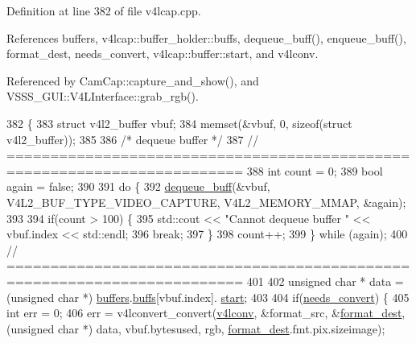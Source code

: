 Definition at line 382 of file v4lcap.\+cpp.



References buffers, v4lcap\+::buffer\+\_\+holder\+::buffs, dequeue\+\_\+buff(), enqueue\+\_\+buff(), format\+\_\+dest, needs\+\_\+convert, v4lcap\+::buffer\+::start, and v4lconv.



Referenced by Cam\+Cap\+::capture\+\_\+and\+\_\+show(), and V\+S\+S\+S\+\_\+\+G\+U\+I\+::\+V4\+L\+Interface\+::grab\+\_\+rgb().


\begin{DoxyCode}
382                                            \{
383     \textcolor{keyword}{struct }v4l2\_buffer vbuf;
384     memset(&vbuf, 0, \textcolor{keyword}{sizeof}(\textcolor{keyword}{struct} v4l2\_buffer));
385 
386     \textcolor{comment}{/* dequeue buffer */}
387     \textcolor{comment}{// =========================================================================}
388     \textcolor{keywordtype}{int} count = 0;
389     \textcolor{keywordtype}{bool} again = \textcolor{keyword}{false};
390 
391     \textcolor{keywordflow}{do} \{
392         \hyperlink{classv4lcap_a73678c131c1ac6c555be3ea125be08da}{dequeue\_buff}(&vbuf, V4L2\_BUF\_TYPE\_VIDEO\_CAPTURE, V4L2\_MEMORY\_MMAP, &again);
393 
394         \textcolor{keywordflow}{if}(count > 100) \{
395             std::cout << \textcolor{stringliteral}{"Cannot dequeue buffer "} << vbuf.index << std::endl;
396             \textcolor{keywordflow}{break};
397         \}
398         count++;
399     \} \textcolor{keywordflow}{while} (again);
400     \textcolor{comment}{// =========================================================================}
401 
402     \textcolor{keywordtype}{unsigned} \textcolor{keywordtype}{char} * data = (\textcolor{keywordtype}{unsigned} \textcolor{keywordtype}{char} *) \hyperlink{classv4lcap_a046084072d2279bb204ed93cd2692700}{buffers}.\hyperlink{structv4lcap_1_1buffer__holder_afa53426fad11e19f7d615f564c979495}{buffs}[vbuf.index].
      \hyperlink{structv4lcap_1_1buffer_ae4fca9eb7724f4a93ee14537fb34597e}{start};
403 
404     \textcolor{keywordflow}{if}(\hyperlink{classv4lcap_acd02d2da6ff03a44a2e155af449144e4}{needs\_convert}) \{
405         \textcolor{keywordtype}{int} err = 0;
406         err = v4lconvert\_convert(\hyperlink{classv4lcap_a5e57bbf84383d7b42d0cc9d1e7e03abb}{v4lconv}, &format\_src, &\hyperlink{classv4lcap_a51d51cae7bdc2fe6aa5bec4ddbeb6c31}{format\_dest}, (\textcolor{keywordtype}{unsigned} \textcolor{keywordtype}{char} *) 
      data, vbuf.bytesused, rgb, \hyperlink{classv4lcap_a51d51cae7bdc2fe6aa5bec4ddbeb6c31}{format\_dest}.fmt.pix.sizeimage);

\end{DoxyCode}
